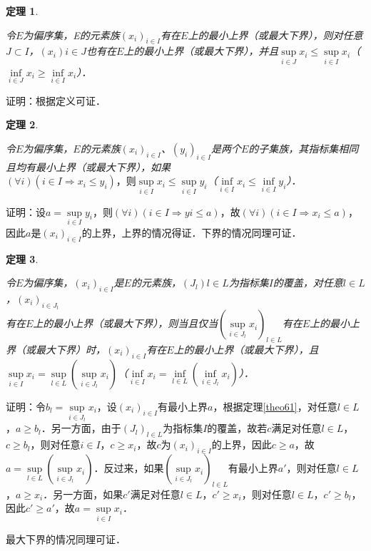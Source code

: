 \documentclass[12pt, a4paper, oneside]{book}
\newtheorem{theo}{定理}
\begin{document}
			\begin{theo}\label{theo62}
				\hfill\par
				令$E$为偏序集，E的元素族$(x_i)_{i\in I}$有在$E$上的最小上界（或最大下界），则对任意$J\subset I$，$(x_i)i\in J$也有在$E$上的最小上界（或最大下界），并且$\mathop{sup}\limits_{i\in J}x_i\leq \mathop{sup}\limits_{i\in I}x_i$（$\mathop{inf}\limits_{i\in J}x_i\geq \mathop{inf}\limits_{i\in I}x_i$）．
			\end{theo}
			证明：根据定义可证．
			
			\begin{theo}\label{theo63}
				\hfill\par
				令$E$为偏序集，$E$的元素族$(x_i)_{i\in I}$、$(y_i)_{i\in I}$是两个$E$的子集族，其指标集相同且均有最小上界（或最大下界），如果$(\forall i)(i\in I\Rightarrow x_i\leq y_i)，则\mathop{sup}\limits_{i\in I}x_i\leq \mathop{sup}\limits_{i\in I}y_i$（$\mathop{inf}\limits_{i\in I}x_i\leq \mathop{inf}\limits_{i\in I}y_i$）．
			\end{theo}
			证明：设$a=\mathop{sup}\limits_{i\in I}y_i$，则$(\forall i)(i\in I\Rightarrow yi\leq a)$，故$(\forall i)(i\in I\Rightarrow x_i\leq a)$，因此$a是(x_i)_{i\in I}$的上界，上界的情况得证．下界的情况同理可证．
			
			\begin{theo}\label{theo64}
				\hfill\par
				令$E$为偏序集，$(x_i)_{i\in I}$是$E$的元素族，$(J_l)l\in L$为指标集$I$的覆盖，对任意$l\in L$，$(x_i)_{i\in J_l}$\\有在$E$上的最小上界（或最大下界），则当且仅当$(\mathop{sup}\limits_{i\in J_l}x_i)_{l\in L}$有在$E$上的最小上界（或最大下界）时，$(x_i)_{i\in I}$有在$E$上的最小上界（或最大下界），且$\mathop{sup}\limits_{i\in I}x_i=\mathop{sup}\limits_{l\in L}(\mathop{sup}\limits_{i\in J_l}x_i)$（$\mathop{inf}\limits_{i\in I}x_i=\mathop{inf}\limits_{l\in L}(\mathop{inf}\limits_{i\in J_l}x_i)$）．
			\end{theo}
			证明：令$b_l=\mathop{sup}\limits_{i\in J_l}x_i$，设$(x_i)_{i\in I}$有最小上界$a$，根据定理\ref{theo61}，对任意$l\in L$，$a\geq b_l$．另一方面，由于$(J_l)_{l\in L}$为指标集$I$的覆盖，故若$c$满足对任意$l\in L$，$c\geq b_l$，则对任意$i\in I$，$c\geq x_i$，故$c为(x_i)_{i\in I}$的上界，因此$c\geq a$，故$a= \mathop{sup}\limits_{l\in L}(\mathop{sup}\limits_{i\in J_l}x_i)$．反过来，如果$(\mathop{sup}\limits_{i\in J_l}x_i)_{l\in L}$有最小上界$a'$，则对任意$l\in L$，$a\geq x_i$．另一方面，如果$c'$满足对任意$l\in L$，$c'\geq x_i$，则对任意$l\in L$，$c'\geq b_l$，因此$c' \geq a'$，故$a=\mathop{sup}\limits_{i\in I}x_i$．
			\par
			最大下界的情况同理可证．
			
\end{document}
